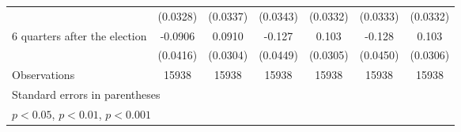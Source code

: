 \begin{table}[htbp]
\begin{tabular}{l*{6}{c}}
                    &    (0.0328)         &    (0.0337)         &    (0.0343)         &    (0.0332)         &    (0.0333)         &    (0.0332)         \\
[1em]
 6 quarters after the election&     -0.0906\sym{*}  &      0.0910\sym{**} &      -0.127\sym{**} &       0.103\sym{***}&      -0.128\sym{**} &       0.103\sym{***}\\
                    &    (0.0416)         &    (0.0304)         &    (0.0449)         &    (0.0305)         &    (0.0450)         &    (0.0306)         \\
\hline
Observations        &       15938         &       15938         &       15938         &       15938         &       15938         &       15938         \\
\hline\hline
\multicolumn{7}{l}{\footnotesize Standard errors in parentheses}\\
\multicolumn{7}{l}{\footnotesize \sym{*} \(p<0.05\), \sym{**} \(p<0.01\), \sym{***} \(p<0.001\)}\\
\end{tabular}
\end{table}
